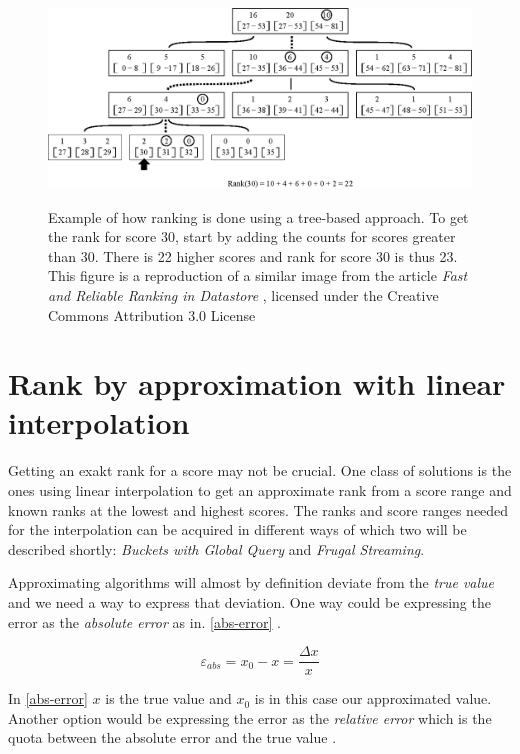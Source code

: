 \begin{figure}[h!]
  \centering
  \caption{Example of how ranking is done using a tree-based approach. To get the rank for score 30, start by adding the counts for scores greater than 30. There is 22 higher scores and rank for score 30 is thus 23.\\This figure is a reproduction of a similar image from the article \emph{Fast and Reliable Ranking in Datastore} \cite{ranking-in-datastore}, licensed under the Creative Commons Attribution 3.0 License}   \label{fig:tree}
\hbox{\hspace{-0.8cm}
  \includegraphics[width=15cm]{img/tree.eps}}
\end{figure}

\section{Rank by approximation with linear interpolation}

Getting an exakt rank for a score may not be crucial. One class of solutions is the ones using linear interpolation to get an approximate rank from a score range and known ranks at the lowest and highest scores. The ranks and score ranges needed for the interpolation can be acquired in different ways of which two will be described shortly: \emph{Buckets with Global Query} and \emph{Frugal Streaming}.

Approximating algorithms will almost by definition deviate from the \emph{true value} and we need a way to express that deviation. One way could be expressing the error as the \emph{absolute error} as in. \ref{abs-error} \cite{pohl}.  

\begin{equation}
  \label{abs-error}
  \varepsilon_{abs} = x_0 - x = \frac{\Delta x}{x} 
\end{equation}

In \ref{abs-error} $x$ is the true value and $x_0$ is in this case our approximated value. Another option would be expressing the error as the \emph{relative error} which is the quota between the absolute error and the true value \cite{pohl}.

